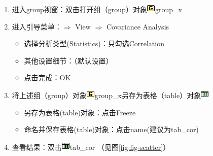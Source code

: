 \documentclass[12pt,(landscape,a4paper),(portrait,a4paper)]{article}
\providecommand{\tightlist}{%
  \setlength{\itemsep}{0pt}\setlength{\parskip}{0pt}}
\begin{document}
\begin{itemize}
\begin{enumerate}
    \begin{enumerate}
    \def\labelenumii{\alph{enumii}.}
    \tightlist
    \item
      进入group视窗：双击打开组（group）对象\includegraphics{picture/object/Group.png}group\_x\\
    \item
      进入引导菜单：\(\Rightarrow\) View \(\Rightarrow\) Covariance
      Analysis

      \begin{itemize}
      \tightlist
      \item
        选择分析类型(Statistics)：只勾选Correlation
      \item
        其他设置细节：（默认设置）
      \item
        点击完成：OK
      \end{itemize}
    \item
      将上述组（group）对象\includegraphics{picture/object/Group.png}group\_x另存为表格（table）对象\includegraphics{picture/object/Table.png}

      \begin{itemize}
      \tightlist
      \item
        另存为表格(table)对象：点击Freeze
      \item
        命名并保存表格(table)对象：点击name(建议为tab\_cor)
      \end{itemize}
    \item
      查看结果：双击\includegraphics{picture/object/Table.png}tab\_cor
      （见图\ref{fig:fig-scatter}）
    \end{enumerate}
  \end{enumerate}
\end{itemize}
\end{document}
